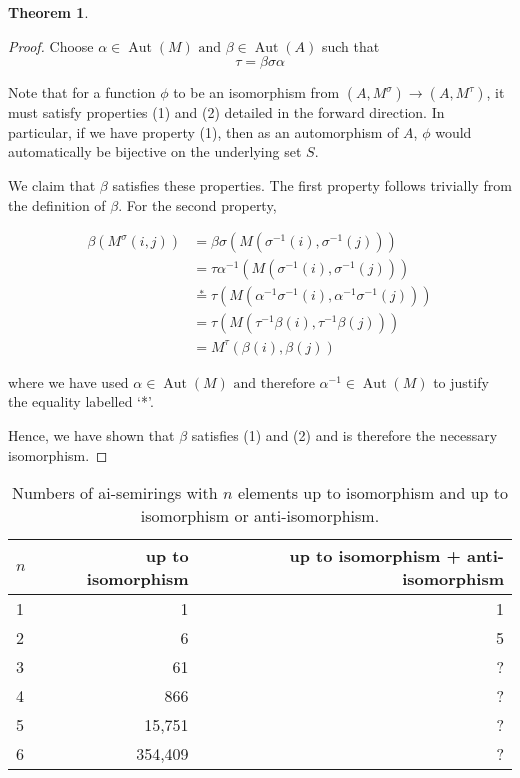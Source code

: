\documentclass{article}
\theoremstyle{definition}
\newtheorem{theorem}{Theorem}
\begin{document}
\begin{theorem}
\begin{proof}
    Choose \(\alpha\in\operatorname{Aut}(M)\text{ and } \beta\in\operatorname{Aut}(A)\) such that 
    \[\tau=\beta\sigma\alpha\]

    Note that for a function \(\phi\) to be an isomorphism from \((A,M^\sigma)\to(A, M^\tau)\), it must satisfy properties (1) and (2) detailed in the forward direction. In particular, if we have property (1), then as an automorphism of \(A\), \(\phi\) would automatically be bijective on the underlying set \(S\).

    We claim that \(\beta\) satisfies these properties. The first property follows trivially from the definition of \(\beta\). For the second property, 

    \begin{align*}
        \beta(M^\sigma(i,j))&=\beta\sigma(M(\sigma^{-1}(i),\sigma^{-1}(j)))\\
        &=\tau\alpha^{-1}(M(\sigma^{-1}(i),\sigma^{-1}(j)))\\
        &\overset{*}{=}\tau(M(\alpha^{-1}\sigma^{-1}(i),\alpha^{-1}\sigma^{-1}(j)))\\
        &=\tau(M(\tau^{-1}\beta(i),\tau^{-1}\beta(j)))\\
        &=M^\tau(\beta(i),\beta(j))
    \end{align*}

    where we have used \(\alpha\in\operatorname{Aut}(M)\text{ and therefore }\alpha^{-1}\in\operatorname{Aut}(M)\) to justify the equality labelled `*'.

    Hence, we have shown that \(\beta\) satisfies (1) and (2) and is therefore the necessary isomorphism.
\end{proof}
\end{theorem}

\begin{table}[h]
  \centering
  \begin{tabular}{l|r|r}
    \toprule
    $n$ & up to isomorphism & up to isomorphism + anti-isomorphism \\
    \midrule
    1 & 1      & 1 \\
    2 & 6      & 5 \\
    3 & 61     & ? \\
    4 & 866    & ? \\
    5 & 15,751 & ? \\
    6 & 354,409 & ? \\
  \end{tabular}
  \caption{Numbers of ai-semirings with $n$ elements up to isomorphism and up
  to isomorphism or anti-isomorphism.}
  \label{tab:example}
\end{table}
\end{document}
